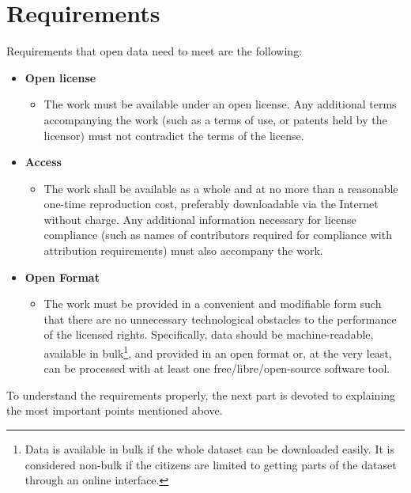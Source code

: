 \documentclass[thesis=B,english]{sprlajur-slovakopendata}[2018/05/12]
\begin{document}
\section{Requirements}
Requirements that open data need to meet are the following:\cite{opendefinition}
\renewcommand\labelitemii{}
\begin{itemize}
	\item \textbf{Open license}
	      \begin{itemize}
	      	\item The work must be available under an open license. Any additional terms accompanying the work (such as a terms of use, or patents held by the licensor) must not contradict the terms of the license.
	      \end{itemize}
	\item \textbf{Access}
	      \begin{itemize}
	      	\item The work shall be available as a whole and at no more than a reasonable one-time reproduction cost, preferably downloadable via the Internet without charge. Any additional information necessary for license compliance (such as names of contributors required for compliance with attribution requirements) must also accompany the work.
	      \end{itemize}
	\item \textbf{Open Format}
	      \begin{itemize}
	      	\item The work must be provided in a convenient and modifiable form such that there are no unnecessary technological obstacles to the performance of the licensed rights. Specifically, data should be machine-readable, available in bulk\footnote{Data is available in bulk if the whole dataset can be downloaded easily. It is considered non-bulk if the citizens are limited to getting parts of the dataset through an online interface.}, and provided in an open format or, at the very least, can be processed with at least one free/libre/open-source software tool.
	      \end{itemize}
\end{itemize}

To understand the requirements properly, the next part is devoted to explaining the most important points mentioned above.
\end{document}
